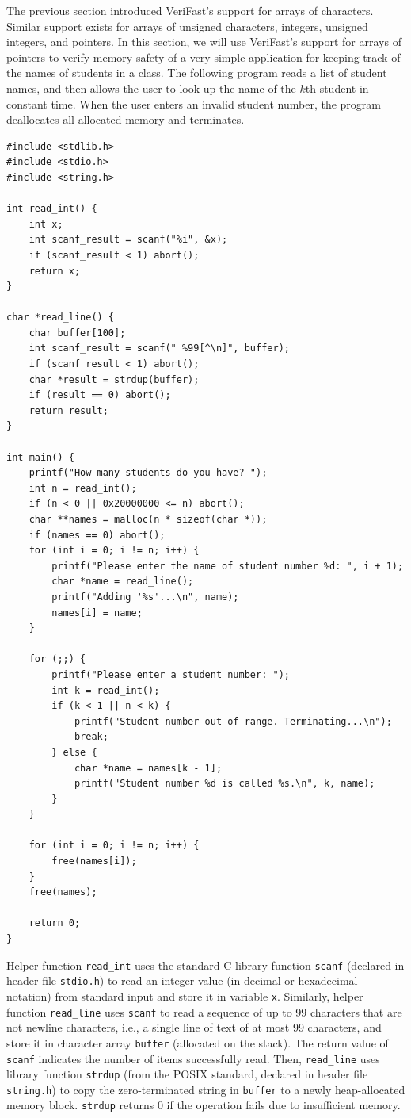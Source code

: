 \documentclass{article}
\begin{document}
The previous section introduced VeriFast's support for arrays
of characters. Similar support exists for arrays of unsigned
characters, integers, unsigned integers, and pointers. In this
section, we will use VeriFast's support for arrays of pointers
to verify memory safety of a very simple application for
keeping track of the names of students in a class. The
following program reads a list of student names, and then
allows the user to look up the name of the $k$th student in
constant time. When the user enters an invalid student number,
the program deallocates all allocated memory and terminates.
\begin{lstlisting}
#include <stdlib.h>
#include <stdio.h>
#include <string.h>

int read_int() {
    int x;
    int scanf_result = scanf("%i", &x);
    if (scanf_result < 1) abort();
    return x;
}

char *read_line() {
    char buffer[100];
    int scanf_result = scanf(" %99[^\n]", buffer);
    if (scanf_result < 1) abort();
    char *result = strdup(buffer);
    if (result == 0) abort();
    return result;
}

int main() {
    printf("How many students do you have? ");
    int n = read_int();
    if (n < 0 || 0x20000000 <= n) abort();
    char **names = malloc(n * sizeof(char *));
    if (names == 0) abort();
    for (int i = 0; i != n; i++) {
        printf("Please enter the name of student number %d: ", i + 1);
        char *name = read_line();
        printf("Adding '%s'...\n", name);
        names[i] = name;
    }

    for (;;) {
        printf("Please enter a student number: ");
        int k = read_int();
        if (k < 1 || n < k) {
            printf("Student number out of range. Terminating...\n");
            break;
        } else {
            char *name = names[k - 1];
            printf("Student number %d is called %s.\n", k, name);
        }
    }

    for (int i = 0; i != n; i++) {
        free(names[i]);
    }
    free(names);

    return 0;
}
\end{lstlisting}
Helper function \lstinline!read_int! uses the standard C
library function \lstinline!scanf! (declared in header file
\lstinline!stdio.h!) to read an integer value (in decimal or
hexadecimal notation) from standard input and store it in
variable \lstinline!x!. Similarly, helper function
\lstinline!read_line! uses \lstinline!scanf! to read a sequence
of up to 99 characters that are not newline characters, i.e., a
single line of text of at most 99 characters, and store it in
character array \lstinline!buffer! (allocated on the stack).
The return value of \lstinline!scanf! indicates the number of
items successfully read. Then, \lstinline!read_line! uses
library function \lstinline!strdup! (from the POSIX standard,
declared in header file \lstinline!string.h!) to copy the
zero-terminated string in \lstinline!buffer! to a newly
heap-allocated memory block. \lstinline!strdup! returns 0 if
the operation fails due to insufficient memory.
\end{document}
